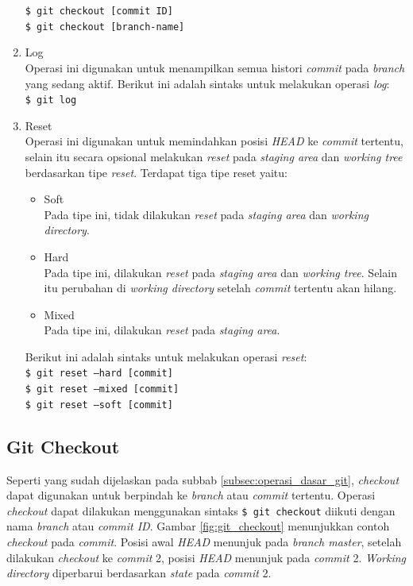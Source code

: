 \begin{enumerate}
\texttt{\$ git checkout [commit ID]}\\
\texttt{\$ git checkout [branch-name]}
\item Log\\
Operasi ini digunakan untuk menampilkan semua histori \textit{commit} pada \textit{branch} yang sedang aktif. Berikut ini adalah sintaks untuk melakukan operasi \textit{log}:\\
\texttt{\$ git log}

\item Reset\\
Operasi ini digunakan untuk memindahkan posisi \textit{HEAD} ke \textit{commit} tertentu, selain itu secara opsional  melakukan \textit{reset} pada \textit{staging area} dan \textit{working tree} berdasarkan tipe \textit{reset}. Terdapat tiga tipe reset yaitu:
\begin{itemize}
\item Soft\\
Pada tipe ini, tidak dilakukan \textit{reset} pada \textit{staging area} dan \textit{working directory}.
\item Hard\\
Pada tipe ini, dilakukan \textit{reset} pada \textit{staging area} dan \textit{working tree}. Selain itu perubahan di \textit{working directory} setelah \textit{commit} tertentu akan hilang.
\item Mixed\\
Pada tipe ini, dilakukan \textit{reset} pada \textit{staging area}.
\end{itemize} 

Berikut ini adalah sintaks untuk melakukan operasi \textit{reset}:\\
\texttt{\$ git reset --hard [commit]}\\
\texttt{\$ git reset --mixed [commit]}\\
\texttt{\$ git reset --soft [commit]}
\end{enumerate}
\subsection{Git Checkout}
\label{subsec:git_checkout}
Seperti yang sudah dijelaskan pada subbab \ref{subsec:operasi_dasar_git}, \textit{checkout} dapat digunakan untuk berpindah ke \textit{branch} atau \textit{commit} tertentu. Operasi \textit{checkout} dapat dilakukan menggunakan sintaks \texttt{\$ git checkout} diikuti dengan nama \textit{branch} atau \textit{commit ID}. Gambar \ref{fig:git_checkout} menunjukkan contoh \textit{checkout} pada \textit{commit}. Posisi awal \textit{HEAD} menunjuk pada \textit{branch master}, setelah dilakukan \textit{checkout} ke \textit{commit} 2, posisi \textit{HEAD} menunjuk pada \textit{commit} 2. \textit{Working directory} diperbarui berdasarkan \textit{state} pada \textit{commit} 2. 

